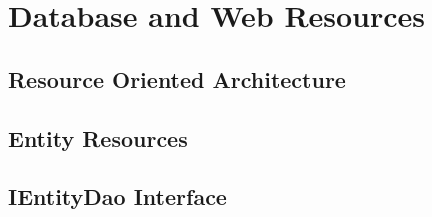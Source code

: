 \chapter{Database and Web Resources}\label{ch:04}

\section{Resource Oriented Architecture}

\section{Entity Resources}

\section{IEntityDao Interface}